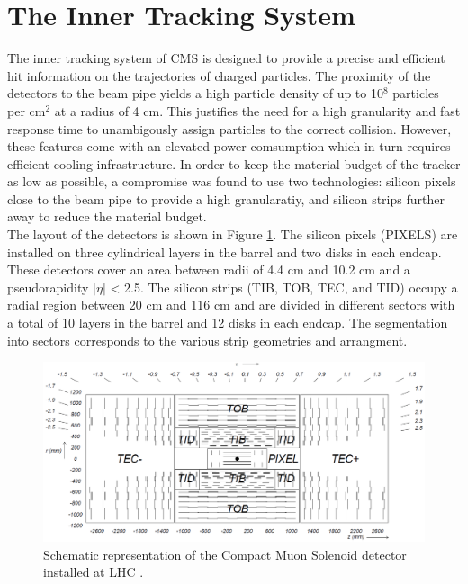   \section{The Inner Tracking System}

    The inner tracking system of CMS is designed to provide a precise and efficient hit information on the trajectories of charged particles.  The proximity of the detectors to the beam pipe yields a high particle density of up to 10$^8$ particles per cm$^2$ at a radius of 4 cm. This justifies the need for a high granularity and fast response time to unambigously assign particles to the correct collision. However, these features come with an elevated power comsumption which in turn requires efficient cooling infrastructure. In order to keep the material budget of the tracker as low as possible, a compromise was found to use two technologies: silicon pixels close to the beam pipe to provide a high granularatiy, and silicon strips further away to reduce the material budget. \\

    The layout of the detectors is shown in Figure \ref{fig:I-3-tracker}. The silicon pixels (PIXELS) are installed on three cylindrical layers in the barrel and two disks in each endcap. These detectors cover an area between radii of 4.4 cm and 10.2 cm and a pseudorapidity $|\eta|$ < 2.5. The silicon strips (TIB, TOB, TEC, and TID) occupy a radial region between 20 cm and 116 cm and are divided in different sectors with a total of 10 layers in the barrel and 12 disks in each endcap. The segmentation into sectors corresponds to the various strip geometries and arrangment. \\

    \begin{figure}[h!]
      \centering
      \includegraphics[width=\textwidth]{img/I-3-cms/tracker.png}
      \caption{Schematic representation of the Compact Muon Solenoid detector installed at LHC \cite{1748-0221-3-08-S08004}.}
      \label{fig:I-3-tracker}
    \end{figure}

